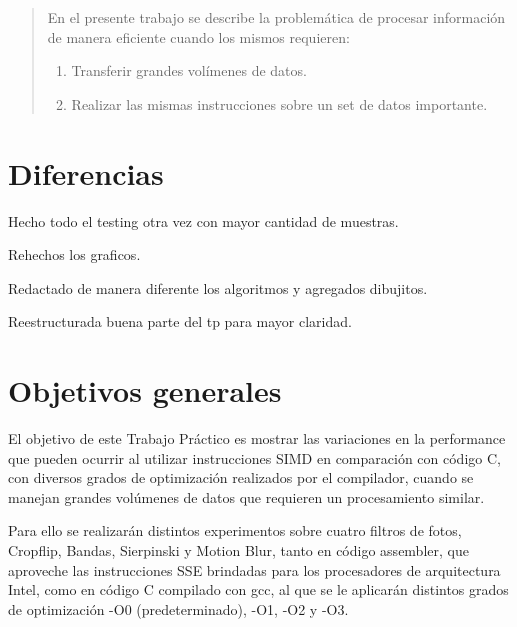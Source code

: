 \documentclass[a4paper]{article}
\begin{document}
\thispagestyle{empty}

\maketitle
\newpage

\thispagestyle{empty}
\vfill
\begin{abstract}
En el presente trabajo se describe la problemática de procesar información de manera eficiente cuando los mismos requieren:
\begin{enumerate}
\item Transferir grandes volímenes de datos.
\item Realizar las mismas instrucciones sobre un set de datos importante.
\end{enumerate}
\end{abstract}
\thispagestyle{empty}
\vspace{3cm}
\tableofcontents
\newpage


\section{Diferencias}

Hecho todo el testing otra vez con mayor cantidad de muestras.

Rehechos los graficos.

Redactado de manera diferente los algoritmos y agregados dibujitos.

Reestructurada buena parte del tp para mayor claridad.

\newpage
\section{Objetivos generales}

El objetivo de este Trabajo Práctico es mostrar las variaciones en la performance que pueden ocurrir al utilizar instrucciones SIMD en comparación con código C, con diversos grados de optimización realizados por el compilador, cuando se manejan grandes volúmenes de datos que requieren un procesamiento similar.

Para ello se realizarán distintos experimentos sobre cuatro filtros de fotos, Cropflip, Bandas, Sierpinski y Motion Blur, tanto en código assembler, que aproveche las instrucciones SSE brindadas para los procesadores de arquitectura Intel, como en código C compilado con gcc, al que se le aplicarán distintos grados de optimización -O0 (predeterminado), -O1, -O2 y -O3.
\end{document}
